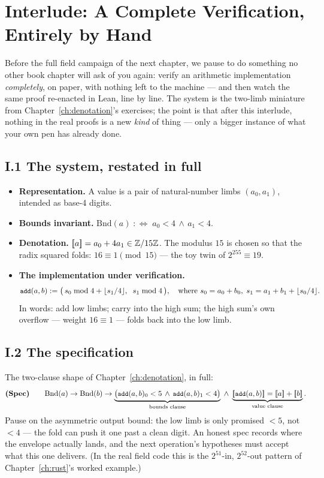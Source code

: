 \chapter*{Interlude: A Complete Verification, Entirely by Hand}

Before the full field campaign of the next chapter, we pause to do
something no other book chapter will ask of you again: verify an
arithmetic implementation \emph{completely}, on paper, with nothing left
to the machine --- and then watch the same proof re-enacted in Lean,
line by line. The system is the two-limb miniature from
Chapter~\ref{ch:denotation}'s exercises; the point is that after this
interlude, nothing in the real proofs is a new \emph{kind} of thing ---
only a bigger instance of what your own pen has already done.

\section*{I.1 \quad The system, restated in full}

\begin{itemize}[leftmargin=1.4em]
\item \textbf{Representation.} A value is a pair of natural-number limbs
$(a_0, a_1)$, intended as base-4 digits.
\item \textbf{Bounds invariant.} $\mathrm{Bnd}(a) \;:\Longleftrightarrow\;
a_0 < 4 \,\wedge\, a_1 < 4$.
\item \textbf{Denotation.} $[\mkern-3.3mu[ a ]\mkern-3.3mu] = a_0 + 4 a_1 \in \mathbb{Z}/15\mathbb{Z}$.
The modulus $15$ is chosen so that the radix squared folds:
$16 \equiv 1 \pmod{15}$ --- the toy twin of $2^{255} \equiv 19$.
\item \textbf{The implementation under verification.}
\[
\code{add}(a, b) := \big(\, s_0 \bmod 4 + \lfloor s_1 / 4 \rfloor,\;\;
s_1 \bmod 4 \,\big),
\quad\text{where } s_0 = a_0 + b_0,\;
s_1 = a_1 + b_1 + \lfloor s_0 / 4 \rfloor .
\]
In words: add low limbs; carry into the high sum; the high sum's own
overflow --- weight $16 \equiv 1$ --- folds back into the low limb.
\end{itemize}

\section*{I.2 \quad The specification}

The two-clause shape of Chapter~\ref{ch:denotation}, in full:
\[
\textbf{(Spec)}\qquad
\mathrm{Bnd}(a) \to \mathrm{Bnd}(b) \to
\underbrace{\big( \code{add}(a,b)_0 < 5 \,\wedge\, \code{add}(a,b)_1 < 4 \big)}_{\text{bounds clause}}
\;\wedge\;
\underbrace{\denote{\code{add}(a,b)} = \denote{a} + \denote{b}}_{\text{value clause}} .
\]
Pause on the asymmetric output bound: the low limb is only promised
$< 5$, not $< 4$ --- the fold can push it one past a clean digit. An
honest spec records where the envelope actually lands, and the next
operation's hypotheses must accept what this one delivers. (In the real
field code this is the $2^{51}$-in, $2^{52}$-out pattern of
Chapter~\ref{ch:rust}'s worked example.)

